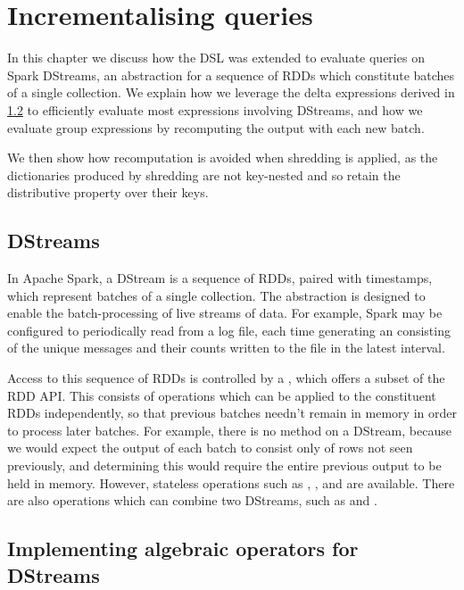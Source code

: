\chapter{Incrementalising queries}

In this chapter we discuss how the DSL was extended to evaluate queries on Spark DStreams, an abstraction for a sequence of RDDs which constitute batches of a single collection. We explain how we leverage the delta expressions derived in \ref{} to efficiently evaluate most expressions involving DStreams, and how we evaluate group expressions by recomputing the output with each new batch.

We then show how recomputation is avoided when shredding is applied, as the dictionaries produced by shredding are not key-nested and so retain the distributive property over their keys.

\section{DStreams}

In Apache Spark, a DStream \cite{dstream} is a sequence of RDDs, paired with timestamps, which represent batches of a single collection. The abstraction is designed to enable the batch-processing of live streams of data. For example, Spark may be configured to periodically read from a log file, each time generating an  consisting of the unique messages and their counts written to the file in the latest interval.

Access to this sequence of RDDs is controlled by a , which offers a subset of the RDD API. This consists of operations which can be applied to the constituent RDDs independently, so that previous batches needn't remain in memory in order to process later batches. For example, there is no method  on a DStream, because we would expect the output of each batch to consist only of rows not seen previously, and determining this would require the entire previous output to be held in memory. However, stateless operations such as , , and  are available. There are also operations which can combine two DStreams, such as  and .


\section{Implementing algebraic operators for DStreams}

